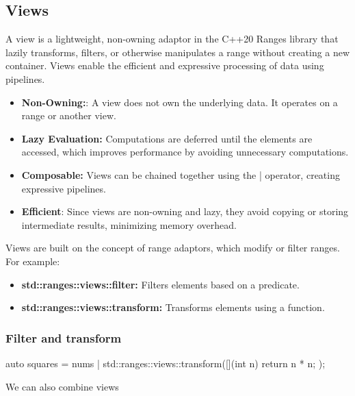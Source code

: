 \documentclass{report}
\begin{document}
     \pagebreak 
     \bigbreak \noindent 
     \subsection{Views}
     \bigbreak \noindent 
     A view is a lightweight, non-owning adaptor in the C++20 Ranges library that lazily transforms, filters, or otherwise manipulates a range without creating a new container. Views enable the efficient and expressive processing of data using pipelines.
     \begin{itemize}
         \item \textbf{Non-Owning:}: A view does not own the underlying data. It operates on a range or another view.
         \item \textbf{Lazy Evaluation:} Computations are deferred until the elements are accessed, which improves performance by avoiding unnecessary computations.
         \item \textbf{Composable:} Views can be chained together using the | operator, creating expressive pipelines.
         \item \textbf{Efficient}: Since views are non-owning and lazy, they avoid copying or storing intermediate results, minimizing memory overhead.
     \end{itemize}
     \bigbreak \noindent 
     Views are built on the concept of range adaptors, which modify or filter ranges. For example:
     \begin{itemize}
         \item \textbf{std::ranges::views::filter:} Filters elements based on a predicate.
         \item \textbf{std::ranges::views::transform:} Transforms elements using a function.
     \end{itemize}
     \bigbreak \noindent 
     \subsubsection{Filter and transform}
         \bigbreak \noindent 
         \begin{cppcode}
         auto squares = nums | std::ranges::views::transform([](int n) { return n * n; });
         \end{cppcode}
         \bigbreak \noindent 
         We can also combine views
         \bigbreak \noindent 
\end{document}
